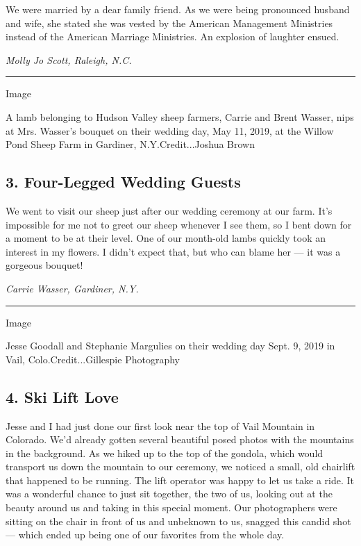 We were married by a dear family friend. As we were being pronounced
husband and wife, she stated she was vested by the American Management
Ministries instead of the American Marriage Ministries. An explosion of
laughter ensued.

\emph{Molly Jo Scott, Raleigh, N.C.}

\begin{center}\rule{0.5\linewidth}{\linethickness}\end{center}

Image

A lamb belonging to Hudson Valley sheep farmers, Carrie and Brent
Wasser, nips at Mrs. Wasser's bouquet on their wedding day, May 11,
2019, at the Willow Pond Sheep Farm in Gardiner, N.Y.Credit...Joshua
Brown

\hypertarget{3-four-legged-wedding-guests}{%
\subsection{3. Four-Legged Wedding
Guests}\label{3-four-legged-wedding-guests}}

We went to visit our sheep just after our wedding ceremony at our farm.
It's impossible for me not to greet our sheep whenever I see them, so I
bent down for a moment to be at their level. One of our month-old lambs
quickly took an interest in my flowers. I didn't expect that, but who
can blame her --- it was a gorgeous bouquet!

\emph{Carrie Wasser, Gardiner, N.Y.}

\begin{center}\rule{0.5\linewidth}{\linethickness}\end{center}

Image

Jesse Goodall and Stephanie Margulies on their wedding day Sept. 9, 2019
in Vail, Colo.Credit...Gillespie Photography

\hypertarget{4-ski-lift-love}{%
\subsection{4. Ski Lift Love}\label{4-ski-lift-love}}

Jesse and I had just done our first look near the top of Vail Mountain
in Colorado. We'd already gotten several beautiful posed photos with the
mountains in the background. As we hiked up to the top of the gondola,
which would transport us down the mountain to our ceremony, we noticed a
small, old chairlift that happened to be running. The lift operator was
happy to let us take a ride. It was a wonderful chance to just sit
together, the two of us, looking out at the beauty around us and taking
in this special moment. Our photographers were sitting on the chair in
front of us and unbeknown to us, snagged this candid shot --- which
ended up being one of our favorites from the whole day.

